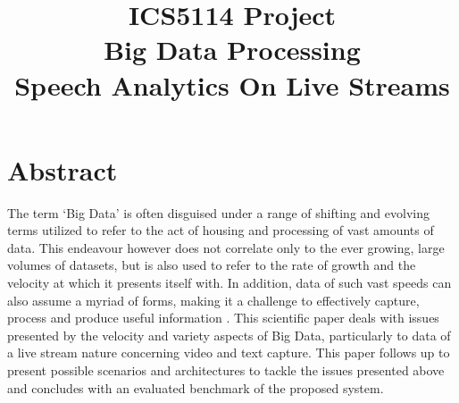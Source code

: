 \documentclass[10pt,conference]{IEEEtran}
\begin{document}
\title{ICS5114 Project\\Big Data Processing\\Speech Analytics On Live Streams}

\author{
\and
}


\maketitle

\pagestyle{fancy}
\fancyhf{}


\section{Abstract}
The term ‘Big Data’ is often disguised under a range of shifting and evolving terms utilized to refer to the act of housing and processing of vast amounts of data. This endeavour however does not correlate only to the ever growing, large volumes of datasets, but is also used to refer to the rate of growth and the velocity at which it presents itself with. In addition, data of such vast speeds can also assume a myriad of forms, making it a challenge to effectively capture, process and produce useful information \cite{DataMiningWithBigData}. This scientific paper deals with issues presented by the velocity and variety aspects of Big Data, particularly to data of a live stream nature concerning video and text capture. This paper follows up to present possible scenarios and architectures to tackle the issues presented above and concludes with an evaluated benchmark of the proposed system.
\end{document}

